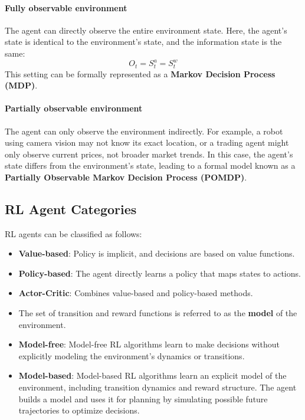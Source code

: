 \paragraph{Fully observable environment} The agent can directly observe the entire environment state. Here, the agent’s state is identical to the environment's state, and the information state is the same:
$$O_t=S_t^a=S_t^w$$
This setting can be formally represented as a \textbf{Markov Decision Process (MDP)}.

\paragraph{Partially observable environment} The agent can only observe the environment indirectly. For example, a robot using camera vision may not know its exact location, or a trading agent might only observe current prices, not broader market trends. In this case, the agent's state differs from the environment's state, leading to a formal model known as a \textbf{Partially Observable Markov Decision Process (POMDP)}.

\subsection{RL Agent Categories}
RL agents can be classified as follows:
\begin{itemize}
    \item \textbf{Value-based}: Policy is implicit, and decisions are based on value functions.
    \item \textbf{Policy-based}: The agent directly learns a policy that maps states to actions.
    \item \textbf{Actor-Critic}: Combines value-based and policy-based methods.
    \item The set of transition and reward functions is referred to as the \textbf{model} of the environment.
    \item \textbf{Model-free}: Model-free RL algorithms learn to make decisions without explicitly modeling the environment's dynamics or transitions.
    \item \textbf{Model-based}: Model-based RL algorithms learn an explicit model of the environment, including transition dynamics and reward structure. The agent builds a model and uses it for planning by simulating possible future trajectories to optimize decisions.
\end{itemize}

